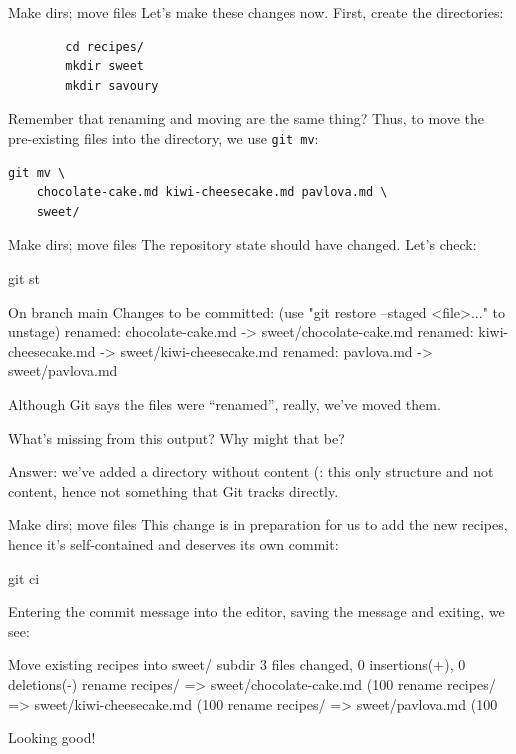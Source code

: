 \begin{frame}[fragile]{Make dirs; move files}
    Let's make these changes now.  First, create the directories:
    \begin{verbatim}
        cd recipes/
        mkdir sweet
        mkdir savoury
    \end{verbatim}

    Remember that renaming and moving are the same thing?  Thus, to move the
    pre-existing files into the  directory, we use
    \texttt{git mv}:
    \begin{verbatim}
git mv \
    chocolate-cake.md kiwi-cheesecake.md pavlova.md \
    sweet/
    \end{verbatim}
\end{frame}

\begin{frame}[fragile]{Make dirs; move files}
    The repository state should have changed.  Let's check:
    \begin{shellcode}
        git st
    \end{shellcode}
    \begin{outputcode}
On branch main
Changes to be committed:
  (use "git restore --staged <file>..." to unstage)
        renamed:    chocolate-cake.md -> sweet/chocolate-cake.md
        renamed:    kiwi-cheesecake.md -> sweet/kiwi-cheesecake.md
        renamed:    pavlova.md -> sweet/pavlova.md
    \end{outputcode}
    Although Git says the files were ``renamed'', really, we've moved them.

    What's missing from this output?  Why might that be?

    Answer: we've added a directory without content (: this
    only structure and not content, hence not something that Git tracks
    directly.
\end{frame}

\begin{frame}[fragile]{Make dirs; move files}
    This change is in preparation for us to add the new recipes, hence it's
    self-contained and deserves its own commit:
    \begin{shellcode}
        git ci
    \end{shellcode}
    Entering the commit message into the editor, saving the message and
    exiting, we see:
    \begin{outputcode}
[main 8705e91] Move existing recipes into sweet/ subdir
 3 files changed, 0 insertions(+), 0 deletions(-)
 rename recipes/{ => sweet}/chocolate-cake.md (100%
 rename recipes/{ => sweet}/kiwi-cheesecake.md (100%
 rename recipes/{ => sweet}/pavlova.md (100%
    \end{outputcode}

    Looking good!
\end{frame}

